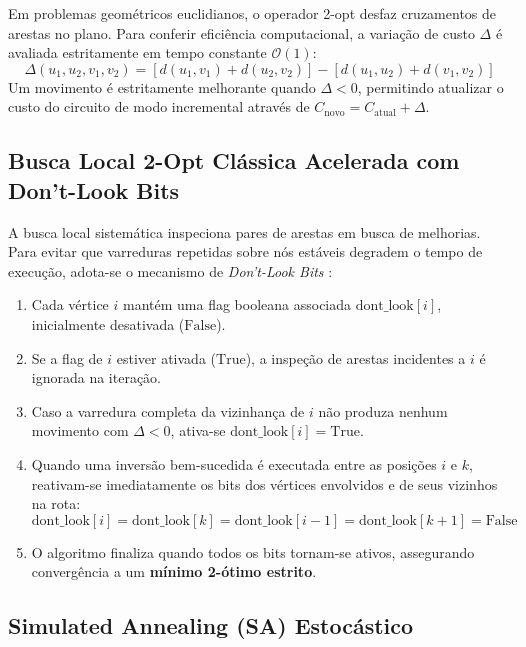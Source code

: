 \documentclass[12pt, a4paper]{article}
\begin{document}
Em problemas geométricos euclidianos, o operador 2-opt desfaz cruzamentos de arestas no plano. Para conferir eficiência computacional, a variação de custo $\Delta$ é avaliada estritamente em tempo constante $\mathcal{O}(1)$:
\begin{equation}
    \Delta(u_1, u_2, v_1, v_2) = \left[ d(u_1, v_1) + d(u_2, v_2) \right] - \left[ d(u_1, u_2) + d(v_1, v_2) \right]
    \label{eq:delta_2opt}
\end{equation}
Um movimento é estritamente melhorante quando $\Delta < 0$, permitindo atualizar o custo do circuito de modo incremental através de $C_{\text{novo}} = C_{\text{atual}} + \Delta$.

\subsection{Busca Local 2-Opt Clássica Acelerada com Don't-Look Bits}

A busca local sistemática inspeciona pares de arestas em busca de melhorias. Para evitar que varreduras repetidas sobre nós estáveis degradem o tempo de execução, adota-se o mecanismo de \textit{Don't-Look Bits} \cite{bentley1992, johnson1997}:
\begin{enumerate}
    \item Cada vértice $i$ mantém uma flag booleana associada $\mathrm{dont\_look}[i]$, inicialmente desativada ($\mathrm{False}$).
    \item Se a flag de $i$ estiver ativada ($\mathrm{True}$), a inspeção de arestas incidentes a $i$ é ignorada na iteração.
    \item Caso a varredura completa da vizinhança de $i$ não produza nenhum movimento com $\Delta < 0$, ativa-se $\mathrm{dont\_look}[i] = \mathrm{True}$.
    \item Quando uma inversão bem-sucedida é executada entre as posições $i$ e $k$, reativam-se imediatamente os bits dos vértices envolvidos e de seus vizinhos na rota:
          \begin{equation}
              \mathrm{dont\_look}[i] = \mathrm{dont\_look}[k] = \mathrm{dont\_look}[i-1] = \mathrm{dont\_look}[k+1] = \mathrm{False}
          \end{equation}
    \item O algoritmo finaliza quando todos os bits tornam-se ativos, assegurando convergência a um \textbf{mínimo 2-ótimo estrito}.
\end{enumerate}

\subsection{Simulated Annealing (SA) Estocástico}
\end{document}
